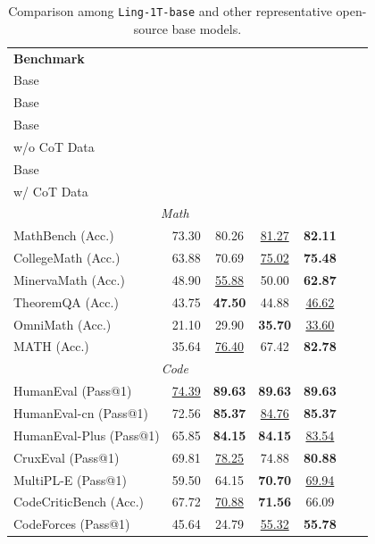 \documentclass[table]{gtech}
\newcommand{\splitcell}[2][c]{\makecell[#1]{#2}}
\theoremstyle{definition}
\begin{document}
\begin{table}[h]
\centering
\caption{{Comparison among \texttt{Ling-1T-base} and other representative open-source base models. }}
\label{tab:ling-1T-base-benchmarks}
\small
{
\begin{tabular}{lcccccc}
\toprule
\textbf{Benchmark} & \textbf{\splitcell{DeepSeek-V3.1 \\ Base}}  & \textbf{\splitcell{Kimi-K2 \\ Base}}  &  \textbf{\splitcell{\texttt{Ling-1T} \\ Base \\ w/o CoT Data}} & \textbf{\splitcell{\texttt{Ling-1T} \\ Base \\ w/ CoT Data}}\\
\midrule
\multicolumn{5}{c}{\textit{Math}} \\
\midrule

MathBench (Acc.) & 73.30 & 80.26 & \underline{81.27} & \textbf{82.11} \\
CollegeMath (Acc.) & 63.88 & 70.69 & \underline{75.02} & \textbf{75.48}\\
MinervaMath (Acc.) & 48.90 & \underline{55.88} & 50.00 & \textbf{62.87}\\

TheoremQA (Acc.) & 43.75 & \textbf{47.50} & 44.88 & \underline{46.62}\\
OmniMath (Acc.) & 21.10 & 29.90 & \textbf{35.70} & \underline{33.60}\\

MATH (Acc.) & 35.64 & \underline{76.40} & 67.42 & \textbf{82.78}\\
\midrule
\multicolumn{5}{c}{\textit{Code}} \\
\midrule
HumanEval (Pass@1) & \underline{74.39} & \textbf{89.63} & \textbf{89.63} & \textbf{89.63} \\
HumanEval-cn (Pass@1) & 72.56 & \textbf{85.37} & \underline{84.76} & \textbf{85.37} \\
HumanEval-Plus (Pass@1) & 65.85 & \textbf{84.15} & \textbf{84.15} & \underline{83.54}\\
CruxEval (Pass@1) & 69.81 & \underline{78.25} & 74.88 & \textbf{80.88}\\
MultiPL-E (Pass@1) & 59.50 & 64.15 & \textbf{70.70} & \underline{69.94}\\
CodeCriticBench (Acc.) & 67.72 & \underline{70.88} & \textbf{71.56} & 66.09 \\
CodeForces (Pass@1) & 45.64 & 24.79 & \underline{55.32} & \textbf{55.78} \\


\end{tabular}}
\end{table}
\end{document}
